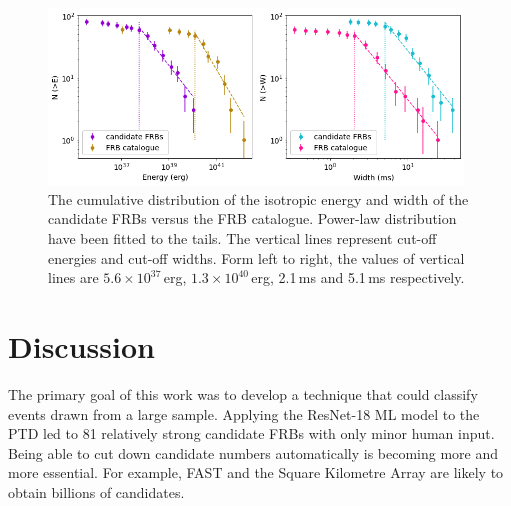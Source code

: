\documentclass[fleqn,usenatbib]{mnras}
\begin{document}
\begin{figure}
\includegraphics[width=0.98\textwidth]{pic/energy_width_0315.png}
    \caption{The cumulative distribution of the isotropic energy and width of the candidate FRBs versus the FRB catalogue. Power-law distribution have been fitted to the tails. The vertical lines represent cut-off energies and cut-off widths. Form left to right, the values of vertical lines are  $5.6\times10^{37}$\,erg, $1.3\times10^{40}$\,erg, 2.1\,ms and 5.1\,ms respectively.}
    \label{fig:5}
\end{figure}




\section{Discussion}
\label{sec:Dis}

The primary goal of this work was to develop a technique that could classify events drawn from a large sample. Applying the ResNet-18 ML model to the PTD led to 81 relatively strong candidate FRBs with only minor human input.   Being able to cut down candidate numbers automatically is becoming more and more essential. For example, FAST \citep{fastcandidate} and the Square Kilometre Array \citep{Dewdney2009} are likely to obtain billions of candidates. %
\end{document}

